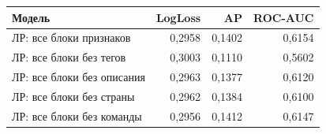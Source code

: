 \begin{tabular}{@{}>{\raggedright\arraybackslash}p{8cm}rrr@{}}
\toprule
Модель & LogLoss & AP & ROC-AUC \\
\midrule
ЛР: все блоки признаков & 0,2958 & 0,1402 & 0,6154 \\
ЛР: все блоки без тегов & 0,3003 & 0,1110 & 0,5602 \\
ЛР: все блоки без описания & 0,2963 & 0,1377 & 0,6120 \\
ЛР: все блоки без страны & 0,2962 & 0,1384 & 0,6100 \\
ЛР: все блоки без команды & 0,2956 & 0,1412 & 0,6147 \\
\bottomrule
\end{tabular}
